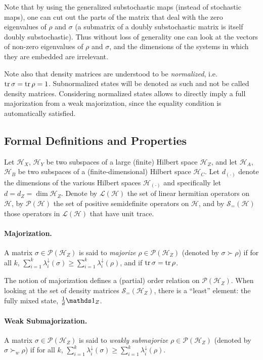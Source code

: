 \documentclass[10pt,letterpaper]{article}
\theoremstyle{plain}
\def\Hs{\mathscr{H}}%
\newcommand{\lD}{\lambda^\downarrow}
\newcommand{\LOps}{\mathscr{L}}
\newcommand{\POps}{\mathscr{P}}
\newcommand{\DOps}{\mathscr{S}_=}
\begin{document}
Note that by using the generalized substochastic maps (instead of stochastic maps), one can cut out the parts
of the matrix that deal with the zero eigenvalues of $\rho$ and $\sigma$ (a submatrix of a doubly substochastic
matrix is itself doubly substochastic). Thus without loss of generality one can look at the vectors of
non-zero eigenvalues of $\rho$ and $\sigma$, and the dimensions of the systems in which they are embedded are
irrelevant.

Note also that density matrices are understood to be {\em normalized}, i.e. $\operatorname{tr}\sigma=\operatorname{tr}\rho=1$. Subnormalized
states will be denoted as such and not be called density matrices. Considering normalized states allows to
directly imply a full majorization from a weak majorization, since the equality condition is automatically
satisfied.


\subsection{Formal Definitions and Properties}

Let $\Hs_X$, $\Hs_Y$ be two subspaces of a large (finite) Hilbert space $\Hs_Z$, and let
$\Hs_A$, $\Hs_B$ be two subspaces of a (finite-dimensional) Hilbert space $\Hs_C$. Let $d_{(\cdot)}$ denote
 the dimensions of the various Hilbert
spaces $\Hs_{(\cdot)}$ and specifically let $d=d_Z=\dim\Hs_Z$. Denote by $\LOps(\Hs)$ the set of linear
hermitian operators on $\Hs$, by $\POps(\Hs)$ the set of positive semidefinite operators on $\Hs$, and
by $\DOps(\Hs)$ those operators in $\LOps(\Hs)$ that have unit trace.

\paragraph{Majorization.} A matrix $\sigma\in\POps(\Hs_Z)$ is said to {\em majorize} $\rho\in\POps(\Hs_Z)$
(denoted by $\sigma\succ\rho$) if for all $k$, $\sum_{i=1}^k \lD_i(\sigma) \geqslant \sum_{i=1}^k \lD_i(\rho)$,
and if $\operatorname{tr}\sigma=\operatorname{tr}\rho$.

The notion of majorization defines a (partial) order relation on $\POps(\Hs_Z)$. When looking at the
set of density matrices $\DOps(\Hs_Z)$, there is a ``least'' element: the fully mixed state,
$\frac{1}{d}\Ident_Z$.

\paragraph{Weak Submajorization.} A matrix $\sigma\in\POps(\Hs_Z)$ is said to {\em weakly submajorize}
$\rho\in\POps(\Hs_Z)$ (denoted by $\sigma\succ_w\rho$) if for all $k$,
$\sum_{i=1}^k \lD_i(\sigma) \geqslant \sum_{i=1}^k \lD_i(\rho)$.
\end{document}

